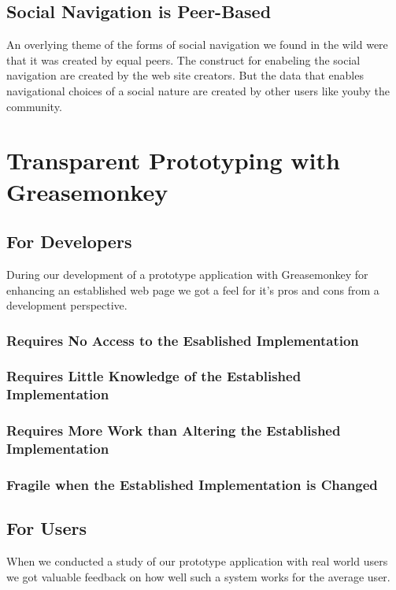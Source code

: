 \subsection{Social Navigation is Peer-Based}

An overlying theme of the forms of social navigation we found in the wild were
that it was created by equal peers. The construct for enabeling the social
navigation are created by the web site creators. But the data that
enables navigational choices of a social nature are created by other users
like you\dash{}by the community.

\section{Transparent Prototyping with Greasemonkey}

\subsection{For Developers}

During our development of a prototype application with Greasemonkey for
enhancing an established web page we got a feel for it's pros and cons from a
development perspective.

\subsubsection{Requires No Access to the Esablished Implementation}

\subsubsection{Requires Little Knowledge of the Established Implementation}

\subsubsection{Requires More Work than Altering the Established Implementation}

\subsubsection{Fragile when the Established Implementation is Changed}


\subsection{For Users}

When we conducted a study of our prototype application with real world users
we got valuable feedback on how well such a system works for the average user.
